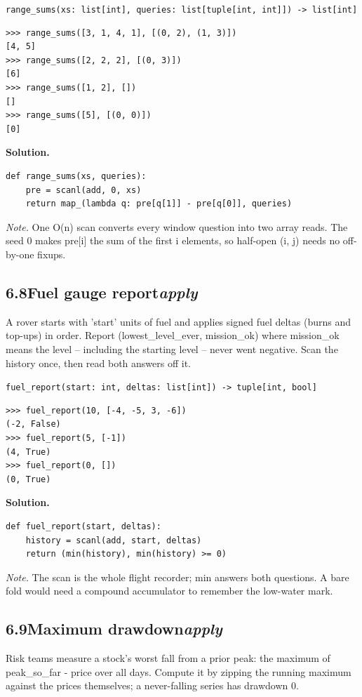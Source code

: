 \documentclass[10pt,letterpaper]{book}
\begin{document}
\noindent\texttt{range\_sums(xs: list[int], queries: list[tuple[int, int]]) -> list[int]}
\begin{lstlisting}[style=ex]
>>> range_sums([3, 1, 4, 1], [(0, 2), (1, 3)])
[4, 5]
>>> range_sums([2, 2, 2], [(0, 3)])
[6]
>>> range_sums([1, 2], [])
[]
>>> range_sums([5], [(0, 0)])
[0]
\end{lstlisting}
\noindent\textbf{Solution.}
\begin{lstlisting}[style=code]
def range_sums(xs, queries):
    pre = scanl(add, 0, xs)
    return map_(lambda q: pre[q[1]] - pre[q[0]], queries)
\end{lstlisting}
\noindent\textit{Note.} One O(n) scan converts every window question into two array reads. The seed 0 makes pre[i] the sum of the first i elements, so half-open (i, j) needs no off-by-one fixups.

\subsection*{6.8\quad Fuel gauge report\hfill\textnormal{\textit{apply}}}
A rover starts with 'start' units of fuel and applies signed fuel deltas (burns and top-ups) in order. Report (lowest\_level\_ever, mission\_ok) where mission\_ok means the level -- including the starting level -- never went negative. Scan the history once, then read both answers off it.

\noindent\texttt{fuel\_report(start: int, deltas: list[int]) -> tuple[int, bool]}
\begin{lstlisting}[style=ex]
>>> fuel_report(10, [-4, -5, 3, -6])
(-2, False)
>>> fuel_report(5, [-1])
(4, True)
>>> fuel_report(0, [])
(0, True)
\end{lstlisting}
\noindent\textbf{Solution.}
\begin{lstlisting}[style=code]
def fuel_report(start, deltas):
    history = scanl(add, start, deltas)
    return (min(history), min(history) >= 0)
\end{lstlisting}
\noindent\textit{Note.} The scan is the whole flight recorder; min answers both questions. A bare fold would need a compound accumulator to remember the low-water mark.

\subsection*{6.9\quad Maximum drawdown\hfill\textnormal{\textit{apply}}}
Risk teams measure a stock's worst fall from a prior peak: the maximum of peak\_so\_far - price over all days. Compute it by zipping the running maximum against the prices themselves; a never-falling series has drawdown 0.
\end{document}
